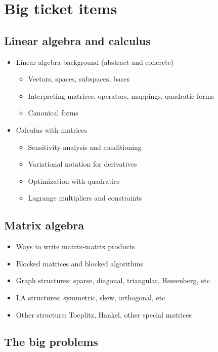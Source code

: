 \documentclass[12pt, leqno]{article} %
\begin{document}



\section{Big ticket items}

\subsection{Linear algebra and calculus}

\begin{itemize}
\item Linear algebra background (abstract and concrete)
  \begin{itemize}
  \item Vectors, spaces, subspaces, bases
  \item Interpreting matrices: operators, mappings, quadratic forms
  \item Canonical forms
  \end{itemize}
\item Calculus with matrices
  \begin{itemize}
  \item Sensitivity analysis and conditioning
  \item Variational notation for derivatives
  \item Optimization with quadratics
  \item Lagrange multipliers and constraints
  \end{itemize}
\end{itemize}

\subsection{Matrix algebra}

\begin{itemize}
\item Ways to write matrix-matrix products
\item Blocked matrices and blocked algorithms
\item Graph structures: sparse, diagonal, triangular, Hessenberg, etc
\item LA structures: symmetric, skew, orthogonal, etc
\item Other structure: Toeplitz, Hankel, other special matrices
\end{itemize}

\subsection{The big problems}
\end{document}
